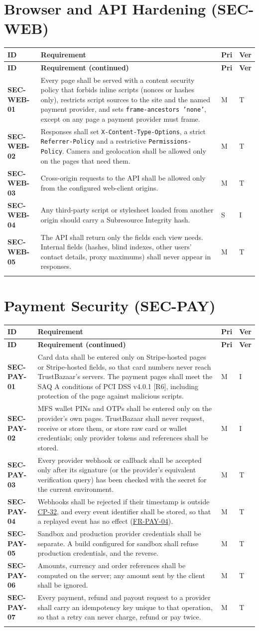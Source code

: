 \documentclass[11pt,a4paper]{report}
\makeatletter
\newenvironment{reqs}{%
  \small
  \begin{longtable}{@{}>{\raggedright\arraybackslash}p{2.35cm}
                       >{\raggedright\arraybackslash}p{10.3cm}
                       >{\centering\arraybackslash}p{0.7cm}
                       >{\centering\arraybackslash}p{0.7cm}@{}}
  \toprule
  \textbf{ID} & \textbf{Requirement} & \textbf{Pri} & \textbf{Ver} \\
  \midrule
  \endfirsthead
  \toprule
  \textbf{ID} & \textbf{Requirement (continued)} & \textbf{Pri} & \textbf{Ver} \\
  \midrule
  \endhead
  \bottomrule
  \endfoot
}{\end{longtable}}
\newcommand{\req}[5]{\leavevmode\textbf{#1}\hypertarget{#1}{} & #5 & #2 & #3 \\ \addlinespace[2pt]}
\newcommand{\rr}[1]{\hyperlink{#1}{#1}}
\newcommand{\cp}[1]{\hyperlink{#1}{#1}}
\makeatother
\begin{document}
\section{Browser and API Hardening (SEC-WEB)}
\begin{reqs}
\req{SEC-WEB-01}{M}{T}{new}{Every page shall be served with a content security policy that forbids inline scripts (nonces or hashes only), restricts script sources to the site and the named payment provider, and sets \texttt{frame-ancestors 'none'}, except on any page a payment provider must frame.}
\req{SEC-WEB-02}{M}{T}{new}{Responses shall set \texttt{X-Content-Type-Options}, a strict \texttt{Referrer-Policy} and a restrictive \texttt{Permissions-Policy}. Camera and geolocation shall be allowed only on the pages that need them.}
\req{SEC-WEB-03}{M}{T}{new}{Cross-origin requests to the API shall be allowed only from the configured web-client origins.}
\req{SEC-WEB-04}{S}{I}{new}{Any third-party script or stylesheet loaded from another origin should carry a Subresource Integrity hash.}
\req{SEC-WEB-05}{M}{T}{new}{The API shall return only the fields each view needs. Internal fields (hashes, blind indexes, other users' contact details, proxy maximums) shall never appear in responses.}
\end{reqs}

\section{Payment Security (SEC-PAY)}
\begin{reqs}
\req{SEC-PAY-01}{M}{I}{FR-49}{Card data shall be entered only on Stripe-hosted pages or Stripe-hosted fields, so that card numbers never reach TrustBazaar's servers. The payment pages shall meet the SAQ A conditions of PCI DSS v4.0.1 [R6], including protection of the page against malicious scripts.}
\req{SEC-PAY-02}{M}{I}{FR-49}{MFS wallet PINs and OTPs shall be entered only on the provider's own pages. TrustBazaar shall never request, receive or store them, or store raw card or wallet credentials; only provider tokens and references shall be stored.}
\req{SEC-PAY-03}{M}{T}{NFR-6}{Every provider webhook or callback shall be accepted only after its signature (or the provider's equivalent verification query) has been checked with the secret for the current environment.}
\req{SEC-PAY-04}{M}{T}{new}{Webhooks shall be rejected if their timestamp is outside \cp{CP-32}, and every event identifier shall be stored, so that a replayed event has no effect (\rr{FR-PAY-04}).}
\req{SEC-PAY-05}{M}{T}{new}{Sandbox and production provider credentials shall be separate. A build configured for sandbox shall refuse production credentials, and the reverse.}
\req{SEC-PAY-06}{M}{T}{new}{Amounts, currency and order references shall be computed on the server; any amount sent by the client shall be ignored.}
\req{SEC-PAY-07}{M}{T}{new}{Every payment, refund and payout request to a provider shall carry an idempotency key unique to that operation, so that a retry can never charge, refund or pay twice.}
\end{reqs}
\end{document}
